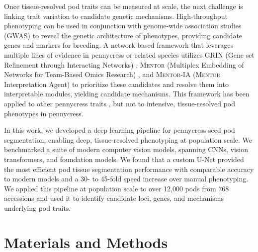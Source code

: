 Once tissue-resolved pod traits can be measured at scale, the next challenge is linking trait variation to candidate genetic mechanisms. High-throughput phenotyping can be used in conjunction with genome-wide association studies (GWAS) \cite{uffelmann2021genome} to reveal the genetic architecture of phenotypes, providing candidate genes and markers for breeding. A network-based framework that leverages multiple lines of evidence in pennycress or related species utilizes GRIN (Gene set Refinement through Interacting Networks) \cite{sullivan2024grin}, \textsc{Mentor} (Multiplex Embedding of Networks for Team-Based Omics Research) \cite{mentor}, and \textsc{Mentor-IA} (\textsc{Mentor} Interpretation Agent) \cite{mentor-ia} to prioritize these candidates and resolve them into interpretable modules, yielding candidate mechanisms. This framework has been applied to other pennycress traits \cite{combsgiroir2024waterlogging}, but not to intensive, tissue-resolved pod phenotypes in pennycress.

In this work, we developed a deep learning pipeline for pennycress seed pod segmentation, enabling deep, tissue-resolved phenotyping at population scale. We benchmarked a suite of modern computer vision models, spanning CNNs, vision transformers, and foundation models. We found that a custom U-Net provided the most efficient pod tissue segmentation performance with comparable accuracy to modern models and a 30- to 45-fold speed increase over manual phenotyping. We applied this pipeline at population scale to over 12,000 pods from 768 accessions and used it to identify candidate loci, genes, and mechanisms underlying pod traits.

\section{Materials and Methods}
